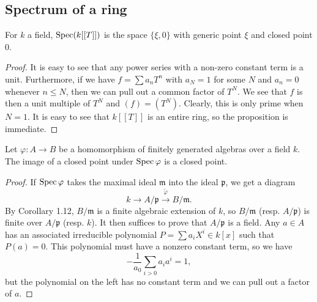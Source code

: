 \subsection{Spectrum of a ring}
\begin{exer}
	For $k$ a field, $\operatorname{Spec} (k[[T]])$ is the space $\{ \xi, 0 \}$ with
	generic point $\xi$ and closed point $0$.
\end{exer}
\begin{proof}
	It is easy to see that any power series with a non-zero constant term is
	a unit. Furthermore, if we have $f = \sum a_nT^n$ with $a_N = 1$ for
	some $N$ and $a_n = 0$ whenever $n \leq N$, then we can pull out a
	common factor of $T^N$. We see that $f$ is then a unit multiple of $T^N$
	and $(f) = (T^N)$. Clearly, this is only prime when $N = 1$. It is easy
	to see that $k[[T]]$ is an entire ring, so the proposition is immediate.
\end{proof}

\begin{exer}
	Let $\varphi: A \to B$ be a homomorphism of finitely generated algebras
	over a field $k$. The image of a closed point under $\operatorname{Spec} \varphi$ is 
	a closed point.
\end{exer}
\begin{proof}
	If $\operatorname{Spec} \varphi$ takes the maximal ideal
	$\mathfrak m$ into the ideal $\mathfrak p$, we get a diagram
	\[
		k \xrightarrow{} A/\mathfrak p \xrightarrow{\widetilde{\varphi}}
		B/\mathfrak m.
	\]
	By Corollary 1.12, $B/\mathfrak m$ is a finite algebraic extension of
	$k$, so $B/\mathfrak m$ (resp. $A/\mathfrak p$) is finite over
	$A/\mathfrak p$ (resp. $k$). It then suffices to prove that
	$A/\mathfrak p$ is a field. Any $a\in A$ has an associated
	irreducible polynomial $P = \sum a_i X^i \in k[x]$ such that $P(a) = 0$.
	This polynomial must have a nonzero constant term, so we have
	\[
		-\frac {1}{a_0} \sum_{i > 0} a_i a^i = 1,
	\]
	but the polynomial on the left has no constant term and we can pull out
	a factor of $a$.
\end{proof}

